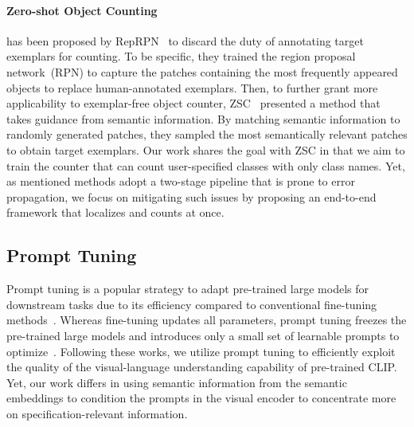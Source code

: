 \paragraph{Zero-shot Object Counting}
has been proposed by RepRPN~\cite{2022RepRPN} to discard the duty of annotating target exemplars for counting.
To be specific, they trained the region proposal network~(RPN) to capture the patches containing the most frequently appeared objects to replace human-annotated exemplars.
Then, to further grant more applicability to exemplar-free object counter, ZSC~\cite{2023zsc} presented a method that takes guidance from semantic information.
By matching semantic information to randomly generated patches, they sampled the most semantically relevant patches to obtain target exemplars.
Our work shares the goal with ZSC in that we aim to train the counter that can count user-specified classes with only class names.
Yet, as mentioned methods adopt a two-stage pipeline that is prone to error propagation, we focus on mitigating such issues by proposing an end-to-end framework that localizes and counts at once.



\subsection{Prompt Tuning}
\label{Related:VPT}
Prompt tuning is a popular strategy to adapt pre-trained large models for downstream tasks due to its efficiency compared to conventional fine-tuning methods~\cite{wang2022learning, gu2021ppt, 2020lp, 2022vpt}.
Whereas fine-tuning updates all parameters, prompt tuning freezes the pre-trained large models and introduces only a small set of learnable prompts to optimize~\cite{li2021prefix, 2022vpt}.
Following these works, we utilize prompt tuning to efficiently exploit the quality of the visual-language understanding capability of pre-trained CLIP.
Yet, our work differs in using semantic information from the semantic embeddings to condition the prompts in the visual encoder to concentrate more on specification-relevant information.